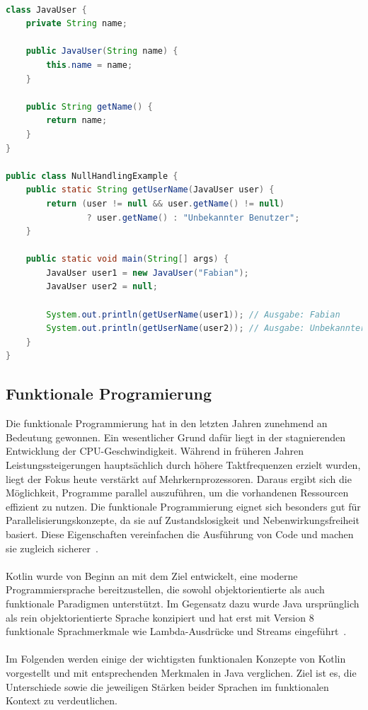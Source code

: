 \documentclass[11pt]{article}
\begin{document}
    \begin{lstlisting}[language=Java, caption={NullHandlingExample.java}, label={lst:java-user-null-safety}]

class JavaUser {
    private String name;

    public JavaUser(String name) {
        this.name = name;
    }

    public String getName() {
        return name;
    }
}

public class NullHandlingExample {
    public static String getUserName(JavaUser user) {
        return (user != null && user.getName() != null)
                ? user.getName() : "Unbekannter Benutzer";
    }

    public static void main(String[] args) {
        JavaUser user1 = new JavaUser("Fabian");
        JavaUser user2 = null;

        System.out.println(getUserName(user1)); // Ausgabe: Fabian
        System.out.println(getUserName(user2)); // Ausgabe: Unbekannter Benutzer
    }
}
    \end{lstlisting}

    \subsection{Funktionale Programierung}

    Die funktionale Programmierung hat in den letzten Jahren zunehmend an Bedeutung gewonnen.
    Ein wesentlicher Grund dafür liegt in der stagnierenden Entwicklung der CPU-Geschwindigkeit.
    Während in früheren Jahren Leistungssteigerungen hauptsächlich durch höhere Taktfrequenzen erzielt wurden, liegt der Fokus heute verstärkt auf Mehrkernprozessoren.
    Daraus ergibt sich die Möglichkeit, Programme parallel auszuführen, um die vorhandenen Ressourcen effizient zu nutzen.
    Die funktionale Programmierung eignet sich besonders gut für Parallelisierungskonzepte, da sie auf Zustandslosigkeit und Nebenwirkungsfreiheit basiert.
    Diese Eigenschaften vereinfachen die Ausführung von Code und machen sie zugleich sicherer~\cite[129]{kotlin-patterns}.\\
    \\
    Kotlin wurde von Beginn an mit dem Ziel entwickelt, eine moderne Programmiersprache bereitzustellen, die sowohl objektorientierte als auch funktionale Paradigmen unterstützt.
    Im Gegensatz dazu wurde Java ursprünglich als rein objektorientierte Sprache konzipiert und hat erst mit Version 8 funktionale Sprachmerkmale wie Lambda-Ausdrücke und Streams eingeführt~\cite[54]{insel}.\\
    \\
    Im Folgenden werden einige der wichtigsten funktionalen Konzepte von Kotlin vorgestellt und mit entsprechenden Merkmalen in Java verglichen.
    Ziel ist es, die Unterschiede sowie die jeweiligen Stärken beider Sprachen im funktionalen Kontext zu verdeutlichen.
\end{document}
